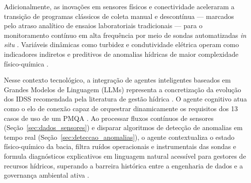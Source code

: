 Adicionalmente, as inovações em sensores físicos e conectividade aceleraram a transição de programas clássicos de coleta manual e descontínua --- marcados pelo atraso analítico de ensaios laboratoriais tradicionais --- para o monitoramento contínuo em alta frequência por meio de sondas automatizadas \textit{in situ} \cite{leigh2019framework}. Variáveis dinâmicas como turbidez e condutividade elétrica operam como indicadores indiretos e preditivos de anomalias hídricas de maior complexidade físico-química \cite{leigh2019framework}.

Nesse contexto tecnológico, a integração de agentes inteligentes baseados em Grandes Modelos de Linguagem (LLMs) representa a concretização da evolução dos IDSS recomendada pela literatura de gestão hídrica \cite{behmel2016water, cheng2026, zhao2026survey}. O agente cognitivo atua como o elo de conexão capaz de orquestrar dinamicamente os requisitos dos 13 casos de uso de um PMQA \cite{behmel2016water}. Ao processar fluxos contínuos de sensores (Seção~\ref{sec:dados_sensores}) e disparar algoritmos de detecção de anomalias em tempo real (Seção~\ref{sec:deteccao_anomalias}), o agente contextualiza o estado físico-químico da bacia, filtra ruídos operacionais e instrumentais das sondas e formula diagnósticos explicativos em linguagem natural acessível para gestores de recursos hídricos, superando a barreira histórica entre a engenharia de dados e a governança ambiental ativa \cite{behmel2016water, leigh2019framework, sun2019building}.

